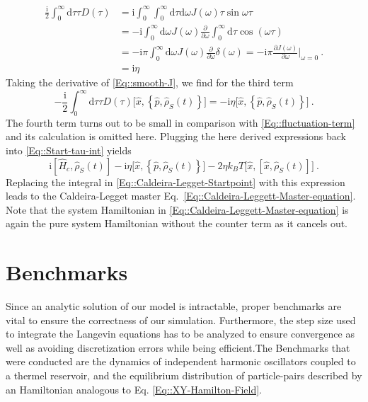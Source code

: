  	\begin{equation}
 		\begin{split}
 				\frac{\mathrm{i}}{2} \int_{0}^{\infty} \text{d} \tau \tau D(\tau) &=	\mathrm{i}\int_0^\infty \int_{0}^{\infty} \text{d}\tau	 \text{d}\omega J(\omega) \tau \sin \omega \tau \\
				&=- \mathrm{i}\int_0^\infty   \text{d}\omega J(\omega) \frac{\partial }{\partial \omega }  \int_{0}^{\infty} \text{d}\tau	\cos \left(\omega \tau \right) \\
				&=- \mathrm{i} \pi \int_0^\infty   \text{d}\omega J(\omega) \frac{\partial }{\partial \omega }  \delta(\omega) = - \mathrm{i} \pi \frac{\partial J(\omega)}{\partial \omega} \bigg|_{\omega =	0}~.\\
				&=  \mathrm{i} \eta
 		\end{split} 	
 	\end{equation} 
 	Taking the derivative of \eqref{Eq::smooth-J}, we find for the third term
 	\begin{equation}
 		-\frac{\mathrm{i}}{2} \int_{0}^{\infty} \text{d} \tau \tau D(\tau) \Big[\hat{x}, \left\{\hat{p}, \hat{\rho}_S(t)\right\} \Big] =	- \mathrm{i} \eta \Big[\hat{x}, \left\{\hat{p}, \hat{\rho}_S(t)\right\} \Big] ~.
 	\end{equation}
 	The fourth term turns out to be small in comparison with \eqref{Eq::fluctuation-term} and its calculation is omitted here. Plugging the here derived expressions back into \eqref{Eq::Start-tau-int} yields
 	\begin{equation}
 		\mathrm{i} \left[\hat{H}_c, \hat{\rho}_S(t)\right] - \mathrm{i} \eta \Big[\hat{x}, \left\{\hat{p}, \hat{\rho}_S(t)\right\} \Big]- 2 \eta k_B T \Big[\hat{x}, \left[{\hat{x}} , \hat{\rho}_S(t)\right]\Big]  ~.
 	\end{equation}
 	Replacing the integral in \eqref{Eq::Caldeira-Legget-Startpoint} with this expression leads to the Caldeira-Legget master Eq.~\eqref{Eq::Caldeira-Leggett-Master-equation}. Note that the system Hamiltonian in \eqref{Eq::Caldeira-Leggett-Master-equation} is again the pure system Hamiltonian without the counter term as it cancels out.
	\section{Benchmarks} \label{Section::Benchmarks}
	Since an analytic solution of our model is intractable, proper benchmarks are vital to ensure the correctness of our simulation. Furthermore, the step size used to integrate the Langevin equations has to be analyzed to ensure convergence as well as avoiding discretization errors while being efficient.The Benchmarks that were conducted are the dynamics of independent harmonic oscillators coupled to a thermel reservoir, and the equilibrium distribution of particle-pairs described by an Hamiltonian analogous to Eq. \eqref{Eq::XY-Hamilton-Field}. \\
	
